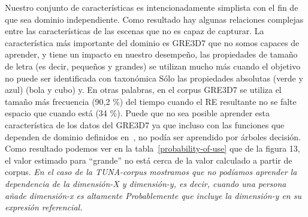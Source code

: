 

Nuestro conjunto de caracter\'{i}sticas es intencionadamente simplista con el fin de que sea
dominio independiente. Como resultado hay algunas relaciones complejas
entre las caracter\'{i}sticas de las escenas que no es capaz de
capturar. La caracter\'{i}stica m\'as importante del dominio es GRE3D7
que no somos capaces de aprender, y tiene un impacto en nuestro desempe\~no,
las propiedades de tama\~no de letra (es decir, peque\~nos y grandes) se utilizan mucho
m\'as cuando el objetivo no puede ser identificada con taxon\'omica
S\'olo las propiedades absolutas (verde y azul) (bola y cubo) y. En
otras palabras, en el corpus GRE3D7 se utiliza el tama\~no m\'as frecuencia (90,2 \%)
del tiempo cuando el RE resultante no se falte espacio que cuando est\'a
(34 \%). Puede que no sea posible aprender esta caracter\'{i}stica de los
datos del GRE3D7 ya que incluso con las funciones que dependen de dominio definidos
en~\cite[Cap\'{i}tulo 6] {viet:gene11}, no pod\'{i}a ser aprendido por \'arboles decisi\'on. Como resultado podemos ver en la tabla~\ref{probability-of-use} que
de la figura 13, el valor estimado para ``grande'' no est\'a cerca de la
valor calculado a partir de corpus. \textit{En el caso de la TUNA-corpus
  mostramos que no pod\'{i}amos aprender la dependencia de la dimensi\'on-X y
  dimensi\'on-y, es decir, cuando una persona a\~nade dimensi\'on-x es altamente
  Probablemente que incluye la dimensi\'on-y en su expresi\'on referencial.}

